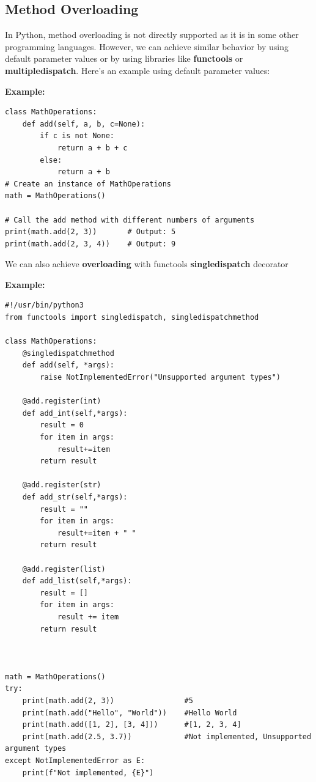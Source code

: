 \documentclass{report}
\begin{document}
    \bigbreak \noindent \bigbreak \noindent 
    \subsection{Method Overloading}
    \bigbreak \noindent 
    In Python, method overloading is not directly supported as it is in some other programming languages. However, we can achieve similar behavior by using default parameter values or by using libraries like \textbf{functools} or \textbf{multipledispatch}. Here's an example using default parameter values:
    \begin{mdframed}
        \textbf{Example:}
        \begin{verbatim}
class MathOperations:
    def add(self, a, b, c=None):
        if c is not None:
            return a + b + c
        else:
            return a + b
# Create an instance of MathOperations
math = MathOperations()

# Call the add method with different numbers of arguments
print(math.add(2, 3))       # Output: 5
print(math.add(2, 3, 4))    # Output: 9
        \end{verbatim}
    \end{mdframed}
    
    \pagebreak \bigbreak \noindent
    We can also achieve \textbf{overloading} with functools \textbf{singledispatch} decorator
    \bigbreak \noindent 
    \begin{mdframed}
      \textbf{Example: }
      \begin{verbatim}
#!/usr/bin/python3
from functools import singledispatch, singledispatchmethod

class MathOperations:
    @singledispatchmethod
    def add(self, *args):
        raise NotImplementedError("Unsupported argument types")

    @add.register(int)
    def add_int(self,*args): 
        result = 0
        for item in args:
            result+=item
        return result

    @add.register(str)
    def add_str(self,*args):
        result = ""
        for item in args:
            result+=item + " "
        return result

    @add.register(list)
    def add_list(self,*args):
        result = []
        for item in args:
            result += item
        return result



math = MathOperations()
try:
    print(math.add(2, 3))                #5
    print(math.add("Hello", "World"))    #Hello World
    print(math.add([1, 2], [3, 4]))      #[1, 2, 3, 4]
    print(math.add(2.5, 3.7))            #Not implemented, Unsupported argument types
except NotImplementedError as E:
    print(f"Not implemented, {E}")

      \end{verbatim}
    \end{mdframed}
\end{document}
